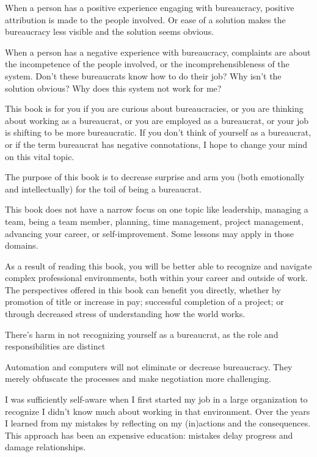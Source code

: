 When a person has a positive experience engaging with bureaucracy, positive attribution is made to the people involved. Or ease of a solution makes the bureaucracy less visible and the solution seems obvious. 

When a person has a negative experience with bureaucracy, complaints are about the incompetence of the people involved, or the incomprehensibleness of the system. Don't these bureaucrats know how to do their job? Why isn't the solution obvious? Why does this system not work for me?


This book is for you if you are curious about bureaucracies, or you are thinking about working as a bureaucrat, or you are employed as a bureaucrat, or your job is shifting to be more bureaucratic. If you don't think of yourself as a bureaucrat, or if the term bureaucrat has negative connotations, I hope to change your mind on this vital topic. 


The purpose of this book is to decrease surprise and arm you (both emotionally and intellectually) for the toil of being a bureaucrat. 

This book does not have a narrow focus on one topic like leadership, managing a team, being a team member, planning, time management, project management, advancing your career, or self-improvement. Some lessons may apply in those domains.

As a result of reading this book, you will be better able to recognize and navigate complex professional environments, both within your career and outside of work. The perspectives offered in this book can benefit you directly, whether by promotion of title or increase in pay; successful completion of a project; or through decreased stress of understanding how the world works.

There's harm in not recognizing yourself as a bureaucrat, as the role and responsibilities are distinct

Automation and computers will not eliminate or decrease bureaucracy. They merely obfuscate the processes and make negotiation more challenging. 

 I was sufficiently self-aware when I first started my job in a large organization to recognize I didn't know much about working in that environment. Over the years I learned from my mistakes by reflecting on my (in)actions and the consequences. This approach has been an expensive education: mistakes delay progress and damage relationships.


